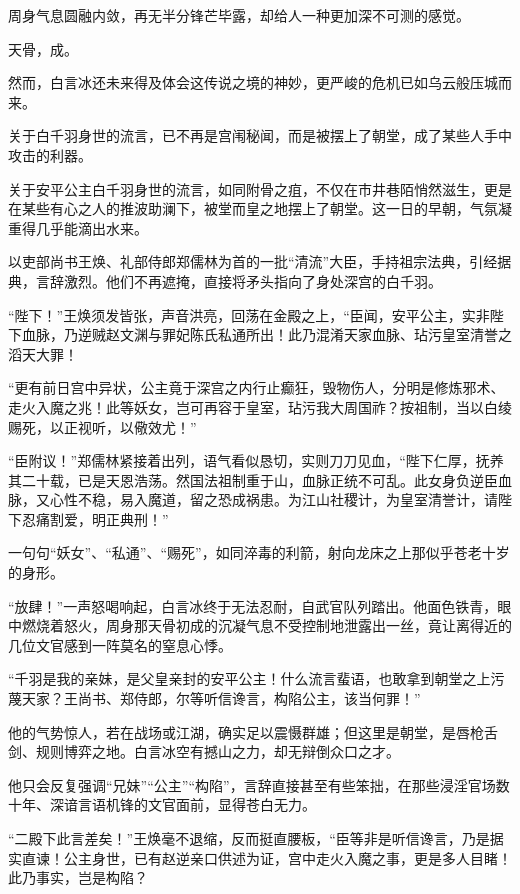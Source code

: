 周身气息圆融内敛，再无半分锋芒毕露，却给人一种更加深不可测的感觉。

天骨，成。

然而，白言冰还未来得及体会这传说之境的神妙，更严峻的危机已如乌云般压城而来。

\vspace{2em}

关于白千羽身世的流言，已不再是宫闱秘闻，而是被摆上了朝堂，成了某些人手中攻击的利器。

关于安平公主白千羽身世的流言，如同附骨之疽，不仅在市井巷陌悄然滋生，更是在某些有心之人的推波助澜下，被堂而皇之地摆上了朝堂。这一日的早朝，气氛凝重得几乎能滴出水来。

以吏部尚书王焕、礼部侍郎郑儒林为首的一批“清流”大臣，手持祖宗法典，引经据典，言辞激烈。他们不再遮掩，直接将矛头指向了身处深宫的白千羽。

“陛下！”王焕须发皆张，声音洪亮，回荡在金殿之上，“臣闻，安平公主，实非陛下血脉，乃逆贼赵文渊与罪妃陈氏私通所出！此乃混淆天家血脉、玷污皇室清誉之滔天大罪！

“更有前日宫中异状，公主竟于深宫之内行止癫狂，毁物伤人，分明是修炼邪术、走火入魔之兆！此等妖女，岂可再容于皇室，玷污我大周国祚？按祖制，当以白绫赐死，以正视听，以儆效尤！”

“臣附议！”郑儒林紧接着出列，语气看似恳切，实则刀刀见血，“陛下仁厚，抚养其二十载，已是天恩浩荡。然国法祖制重于山，血脉正统不可乱。此女身负逆臣血脉，又心性不稳，易入魔道，留之恐成祸患。为江山社稷计，为皇室清誉计，请陛下忍痛割爱，明正典刑！”

一句句“妖女”、“私通”、“赐死”，如同淬毒的利箭，射向龙床之上那似乎苍老十岁的身形。

“放肆！”一声怒喝响起，白言冰终于无法忍耐，自武官队列踏出。他面色铁青，眼中燃烧着怒火，周身那天骨初成的沉凝气息不受控制地泄露出一丝，竟让离得近的几位文官感到一阵莫名的窒息心悸。

“千羽是我的亲妹，是父皇亲封的安平公主！什么流言蜚语，也敢拿到朝堂之上污蔑天家？王尚书、郑侍郎，尔等听信谗言，构陷公主，该当何罪！”

他的气势惊人，若在战场或江湖，确实足以震慑群雄；但这里是朝堂，是唇枪舌剑、规则博弈之地。白言冰空有撼山之力，却无辩倒众口之才。

他只会反复强调“兄妹”“公主”“构陷”，言辞直接甚至有些笨拙，在那些浸淫官场数十年、深谙言语机锋的文官面前，显得苍白无力。

“二殿下此言差矣！”王焕毫不退缩，反而挺直腰板，“臣等非是听信谗言，乃是据实直谏！公主身世，已有赵逆亲口供述为证，宫中走火入魔之事，更是多人目睹！此乃事实，岂是构陷？

